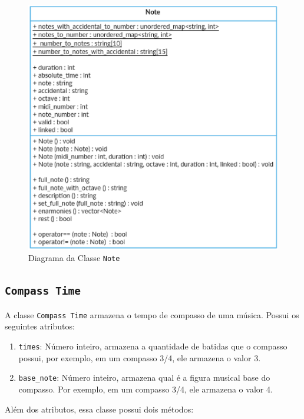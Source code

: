       \begin{figure}[htb]
        \centering
        \includegraphics[scale=0.7]{figuras/noteclass.eps}
        \caption{Diagrama da Classe \texttt{Note}}
        \label{noteclass}
      \end{figure}

    \subsection[Classe \texttt{Compass Time}]{\texttt{Compass Time}}

      A classe \texttt{Compass Time} armazena o tempo de compasso de uma música. Possui os seguintes atributos:

      \begin{enumerate}
        \item \texttt{times}: Número inteiro, armazena a quantidade de batidas que o compasso possui, por exemplo, em um compasso 3/4, ele armazena o valor 3.
        \item \texttt{base\_note}: Número inteiro, armazena qual é a figura musical base do compasso. Por exemplo, em um compasso 3/4, ele armazena o valor 4.
      \end{enumerate}

      Além dos atributos, essa classe possui dois métodos:

